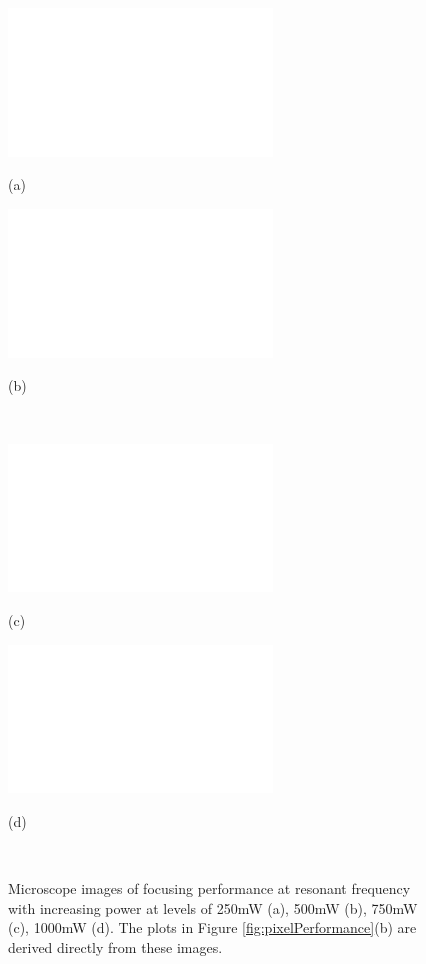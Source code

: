 \begin{figure}[htb]
  \begin{minipage}[t]{0.49\linewidth}\centering
    \includegraphics[width=7cm]{25ul250mWBaseline_3}
    \medskip
    \centerline{(a)}
  \end{minipage}\hfill
  \begin{minipage}[t]{0.49\linewidth}\centering
    \includegraphics[width=7cm]{25ul500mWBaseline_3}
    \medskip
    \centerline{(b)}
  \end{minipage}\\
  \begin{minipage}[t]{0.49\linewidth}\centering
    \includegraphics[width=7cm]{25ul750mWBaseline_3}
    \medskip
    \centerline{(c)}
  \end{minipage}\hfill
  \begin{minipage}[t]{0.49\linewidth}\centering
    \includegraphics[width=7cm]{25ul1000mWBaseline_3}
    \medskip
    \centerline{(d)}
  \end{minipage}\\
  \caption[Microscope images at resonant frequency for increasing power levels]{Microscope images of focusing performance at resonant frequency with increasing power at levels of 250mW (a), 500mW (b), 750mW (c), 1000mW (d). The plots in Figure \ref{fig:pixelPerformance}(b) are derived directly from these images.}
	\label{fig:microscopePics}
\end{figure}

